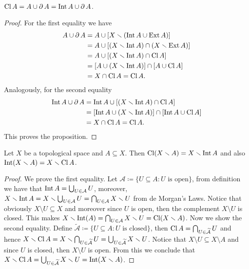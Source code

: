 \begin{proposition}
    \label{prop:closure-composition}
    \(\operatorname{Cl} A = A \cup \operatorname{\partial} A = \operatorname{Int} A \cup \operatorname{\partial} A\).
\end{proposition}

\begin{proof}
    For the first equality we have
    \begin{align*}
        A \cup \operatorname{\partial} A
         & = A \cup [X \smallsetminus (\operatorname{Int} A \cup \operatorname{Ext} A)]               \\
         & = A \cup [(X \smallsetminus \operatorname{Int} A) \cap (X \smallsetminus \operatorname{Ext} A)] \\
         & = A \cup [(X \smallsetminus \operatorname{Int} A) \cap \operatorname{Cl} A]                \\
         & = [A \cup (X \smallsetminus \operatorname{Int} A)] \cap [A \cup \operatorname{Cl} A]       \\
         & = X \cap \operatorname{Cl} A = \operatorname{Cl} A.
    \end{align*}
    Analogously, for the second equality
    \begin{align*}
        \operatorname{Int} A \cup \operatorname{\partial} A
         & = \operatorname{Int} A \cup [(X \smallsetminus \operatorname{Int} A) \cap \operatorname{Cl} A]               \\
         & = [\operatorname{Int} A \cup (X \smallsetminus \operatorname{Int} A)] \cap [\operatorname{Int} A \cup \operatorname{Cl} A] \\
         & = X \cap \operatorname{Cl} A = \operatorname{Cl} A.
    \end{align*}
    This proves the proposition.
\end{proof}

\begin{proposition}
    Let \(X\) be a topological space and \(A \subseteq X\). Then
    \(\operatorname{Cl}(X \smallsetminus A) = X \smallsetminus \operatorname{Int} A\) and also
    \(\operatorname{Int}(X \smallsetminus A) = X \smallsetminus \operatorname{Cl} A\).
\end{proposition}

\begin{proof}
    We prove the first equality. Let
    \(\mathcal A \coloneq \{U \subseteq A \colon U \text{ is open}\}\), from
    definition we have that \(\operatorname{Int} A = \bigcup_{U \in \mathcal A} U\), moreover,
    \(X \smallsetminus \operatorname{Int} A = X \smallsetminus \bigcup_{U \in \mathcal A} U = \bigcap_{U \in
        \mathcal A} X \smallsetminus U\) from de Morgan's Laws. Notice that obviously
    \(X \setminus U \subseteq X\) and moreover since \(U\) is open, then the
    complement \(X \setminus U\) is closed. This makes
    \(X \smallsetminus \operatorname{Int}(A) = \bigcap_{U \in \mathcal A} X \smallsetminus U = \operatorname{Cl}(X
    \smallsetminus A)\). Now we show the second equality. Define
    \(\mathcal{\widetilde A} \coloneq \{U \subseteq A \colon U \text{ is
        closed}\}\), then \(\operatorname{Cl} A = \bigcap_{U \in \mathcal{\widetilde A}} U\) and
    hence
    \(X \smallsetminus \operatorname{Cl} A = X \smallsetminus \bigcap_{U \in \mathcal{\widetilde A}} U =
    \bigcup_{U \in \widetilde{\mathcal{A}}} X \smallsetminus U\). Notice that
    \(X\setminus U \subseteq X \setminus A\) and since \(U\) is closed, then
    \(X \setminus U\) is open. From this we conclude that
    \(X \smallsetminus \operatorname{Cl} A = \bigcup_{U \in \mathcal{\widetilde A}} X \smallsetminus U =
    \operatorname{Int}(X \smallsetminus A)\).
\end{proof}

